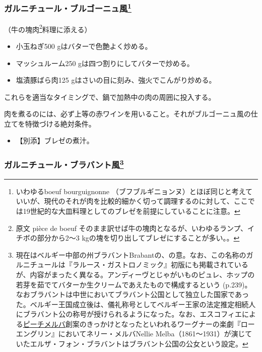 \begin{recette}
\atoaki{}

\hypertarget{garniture-bourguignonne}{%
\subsubsection[ガルニチュール・ブルゴーニュ風]{\texorpdfstring{ガルニチュール・ブルゴーニュ風\footnote{いわゆるboeuf
  bourguignonne
  （ブフブルギニョンヌ）とほぼ同じと考えていいが、現代のそれが肉を比較的細かく切って調理するのに対して、ここでは19世紀的な大皿料理としてのブレゼを前提にしていることに注意。}}{ガルニチュール・ブルゴーニュ風}}\label{garniture-bourguignonne}}



（牛の塊肉\footnote{原文 pièce de boeuf
  そのまま訳せば牛の塊肉となるが、いわゆるランプ、イチボの部分から2〜3
  kgの塊を切り出してブレゼにすることが多い。。}料理に添える）

\begin{itemize}
\item
  小玉ねぎ500 gはバターで色艶よく炒める。
\item
  マッシュルーム250 gは四つ割りにしてバターで炒める。
\item
  塩漬豚ばら肉125 gはさいの目に刻み、強火でこんがり炒める。
\end{itemize}

これらを適当なタイミングで、鍋で加熱中の肉の周囲に投入する。

肉を煮るのには、必ず上等の赤ワインを用いること。それがブルゴーニュ風の仕立てを特徴づける絶対条件。

\begin{itemize}
\tightlist
\item
  【別添】ブレゼの煮汁。
\end{itemize}

\atoaki{}

\hypertarget{garniture-brabanconne}{%
\subsubsection[ガルニチュール・ブラバント風]{\texorpdfstring{ガルニチュール・ブラバント風\footnote{現在はベルギー中部の州ブラバントBrabantの、の意。なお、この名称のガルニチュールは『ラルース・ガストロノミック』初版にも掲載されているが、内容がまったく異なる。アンディーヴとじゃがいものピュレ、ホップの若芽を茹でてバターか生クリームであえたもので構成するという
  (p.239)。なおブラバントは中世においてブラバント公国として独立した国家であった。ベルギー王国成立後は、儀礼称号としてベルギー王家の法定推定相続人にブラバント公の称号が授けられるようになった。なお、エスコフィエによる\protect\hyperlink{peches-melba}{ピーチメルバ}創案のきっかけとなったといわれるワーグナーの楽劇『ローエングリン』においてネリー・メルバNellie
  Melba（1861〜1931）が演じていたエルザ・フォン・ブラバントはブラバント公国の公女という設定。}}{ガルニチュール・ブラバント風}}\label{garniture-brabanconne}}


\end{recette}
